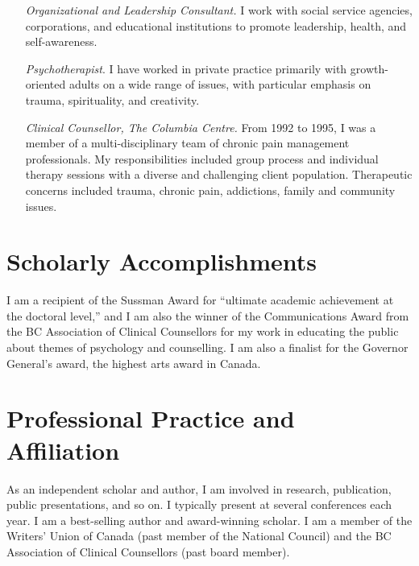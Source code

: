 \documentclass[10pt,DIV09,letterpaper,oneside,headsepline]{scrreprt}
\begin{document}
\begin{itemize} \item [\textit{Organizational and Leadership Consultant.}] I work with social service agencies, corporations, and educational institutions to promote leadership, health, and self-awareness. \end{itemize}

\begin{itemize} \item [\textit{Psychotherapist}.] I have worked in private practice primarily with growth-oriented adults on a wide range of issues, with particular emphasis on trauma, spirituality, and creativity. \end{itemize}

\begin{itemize} \item [\textit{Clinical Counsellor, The Columbia Centre.}] From 1992 to 1995, I was a member of a multi-disciplinary team of chronic pain management professionals. My responsibilities included group process and individual therapy sessions with a diverse and challenging client population. Therapeutic concerns included trauma, chronic pain, addictions, family and community issues. \end{itemize}

\section{Scholarly Accomplishments}
I am a recipient of the Sussman Award for ``ultimate academic achievement at the doctoral level,'' and I am also the winner of the Communications Award from the BC Association of Clinical Counsellors for my work in educating the public about themes of psychology and counselling. I am also a finalist for the Governor General's award, the highest arts award in Canada.

\section{Professional Practice and Affiliation}

As an independent scholar and author, I am involved in research, publication, public presentations, and so on. I typically present at several conferences each year. I am a best-selling author and award-winning scholar. I am a member of the Writers' Union of Canada (past member of the National Council) and the BC Association of Clinical Counsellors (past board member).
\end{document}
